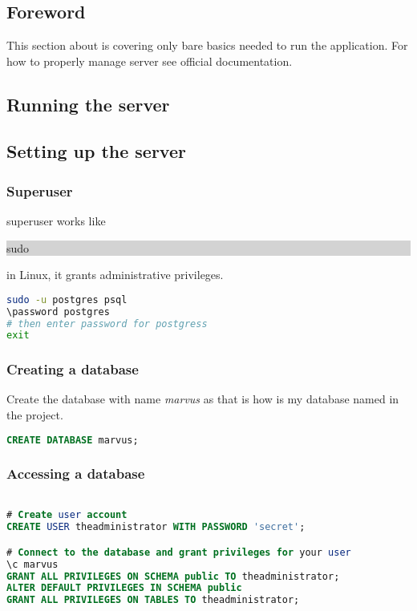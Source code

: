 
\section{\postsql}
\subsection{Foreword}
This section about \postsql is covering only bare basics needed to run the application. For how to properly manage \postsql server see official \postsql documentation.

\subsection{Running the server}

\subsection{Setting up the server}

\subsubsection{Superuser}
\postsql superuser works like \colorbox{lightgray}{\strut sudo} in Linux, it grants administrative privileges.

\begin{lstlisting}[language=bash, caption={Setting password for PostgreSQL superuser},  label={lst:postgres-superuser}]
sudo -u postgres psql
\password postgres
# then enter password for postgress
exit
\end{lstlisting}

\subsubsection{Creating a database}

Create the database with name \textit{marvus} as that is how is my database named in the project.

\begin{lstlisting}[language=sql, caption={Creating PostgreSQL database},  label={lst:postgres-db}]
CREATE DATABASE marvus;
\end{lstlisting}

\subsubsection{Accessing a database}

\begin{lstlisting}[language=sql, numbers=none]

# Create user account
CREATE USER theadministrator WITH PASSWORD 'secret';

# Connect to the database and grant privileges for your user
\c marvus
GRANT ALL PRIVILEGES ON SCHEMA public TO theadministrator;
ALTER DEFAULT PRIVILEGES IN SCHEMA public 
GRANT ALL PRIVILEGES ON TABLES TO theadministrator;
\end{lstlisting}



